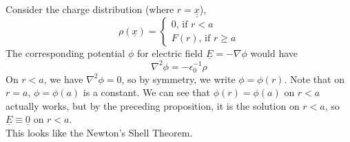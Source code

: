 \begin{example}
    Consider the charge distribution (where $r=\underline{\underline{x}}$),
    $$\rho(\underline{x})=\begin{cases}
        0\text{, if $r<a$}\\
        F(r)\text{, if $r\ge a$}
    \end{cases}$$
    The corresponding potential $\phi$ for electric field $\underline{E}=-\nabla\phi$ would have
    $$\nabla^2\phi=-\epsilon_0^{-1}\rho$$
    On $r<a$, we have $\nabla^2\phi=0$, so by symmetry, we write $\phi=\phi(r)$.
    Note that on $r=a$, $\phi=\phi(a)$ is a constant.
    We can see that $\phi(r)=\phi(a)$ on $r<a$ actually works, but by the preceding proposition, it is the solution on $r<a$, so $\underline{E}\equiv \underline{0}$ on $r<a$.\\
    This looks like the Newton's Shell Theorem.
\end{example}
